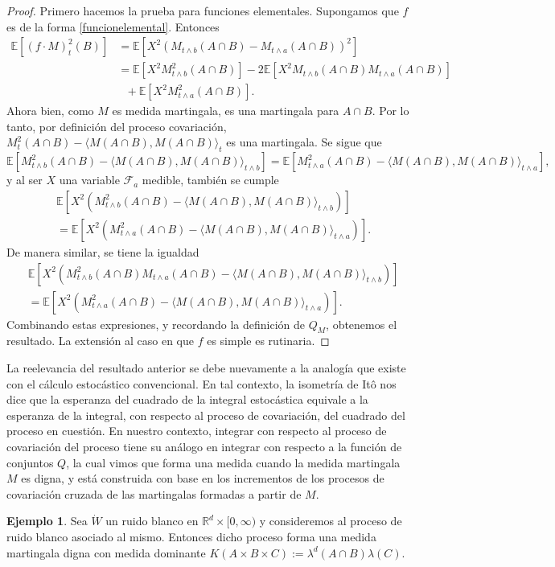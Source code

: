 \documentclass[letterpaper,twoside,12pt]{book}
\newcommand{\R}{\mathbb{R}}
\newcommand{\F}{\mathcal{F}}
\newcommand{\E}{\mathbb{E}}
\newcommand{\W}{\dot{W}}
\newcommand{\1}{\mathds{1}}
\theoremstyle{definition}
\theoremstyle{definition}
\theoremstyle{remark}
\theoremstyle{definition}
\theoremstyle{definition}
\theoremstyle{definition}
\theoremstyle{definition}
\newtheorem{ejem}{Ejemplo}
\theoremstyle{definition}
\begin{document}
\begin{proof} 
   Primero hacemos la prueba para funciones elementales. Supongamos que $f$ es de la forma \eqref{funcionelemental}. Entonces 
   \begin{align*}
      \E\left[(f\cdot M)^2_t(B)\right]&=\E\left[X^2 \left(M_{t\wedge b}(A\cap B)-M_{t\wedge a}(A\cap B)\right)^2\right]\\
      &=\E\left[X^2M_{t\wedge b}^2(A\cap B)\right]-2 \E\left[X^2M_{t\wedge b}(A\cap B)M_{t\wedge a}(A\cap B)\right]\\
      &\ \ \ +\E\left[X^2M^2_{t\wedge a}(A\cap B)\right].
   \end{align*}
   Ahora bien, como $M$ es medida martingala, es una martingala para $A\cap B$. Por lo tanto, por definición del proceso covariación, $M^2_t(A\cap B)-\langle M(A\cap B),M(A\cap B)\rangle_t$ es una martingala. Se sigue que 
   \[
   \E\left[M_{t\wedge b}^2(A\cap B)-\langle M(A\cap B),M(A\cap B)\rangle_{t\wedge b}\right]=\E\left[M_{t\wedge a}^2(A\cap B)-\langle M(A\cap B),M(A\cap B)\rangle_{t\wedge a}\right],
   \]
   y al ser $X$ una variable $\F_a$ medible, también se cumple 
      \begin{align*}
         &\E\left[X^2 \left(M_{t\wedge b}^2(A\cap B)-\langle M(A\cap B),M(A\cap B)\rangle_{t\wedge b}\right)\right]\\
         &=\E\left[X^2 \left(M_{t\wedge a}^2(A\cap B)-\langle M(A\cap B),M(A\cap B)\rangle_{t\wedge a}\right)\right].
      \end{align*}
   De manera similar, se tiene la igualdad 
   \begin{align*}
      &\E\left[X^2 \left(M_{t\wedge b}^2(A\cap B)M_{t\wedge a}(A\cap B)-\langle M(A\cap B),M(A\cap B)\rangle_{t\wedge b}\right)\right]\\
      &=\E\left[X^2 \left(M_{t\wedge a}^2(A\cap B)-\langle M(A\cap B),M(A\cap B)\rangle_{t\wedge a}\right)\right].
   \end{align*}
   Combinando estas expresiones, y recordando la definición de $Q_M$, obtenemos el resultado. La extensión al caso en que $f$ es simple es rutinaria.
 \end{proof}
La reelevancia del resultado anterior se debe nuevamente a la analogía que existe con el cálculo estocástico convencional. En tal contexto, la isometría de Itô nos dice que la esperanza del cuadrado de la integral estocástica equivale a la esperanza de la integral, con respecto al proceso de covariación, del cuadrado del proceso en cuestión. En nuestro contexto, integrar con respecto al proceso de covariación del proceso tiene su análogo en integrar con respecto a la función de conjuntos $Q$, la cual vimos que forma una medida cuando la medida martingala $M$ es digna, y está construida con base en los incrementos de los procesos de covariación cruzada de las martingalas formadas a partir de $M$.
\begin{ejem} 
Sea $\W$ un ruido blanco en $\R^{d}\times[0,\infty)$ y consideremos al proceso de ruido blanco asociado al mismo. Entonces dicho proceso forma una medida martingala digna con medida dominante $K(A\times B \times C):=\lambda^{d}(A\cap B)\lambda(C)$.
\end{ejem}
\end{document}
